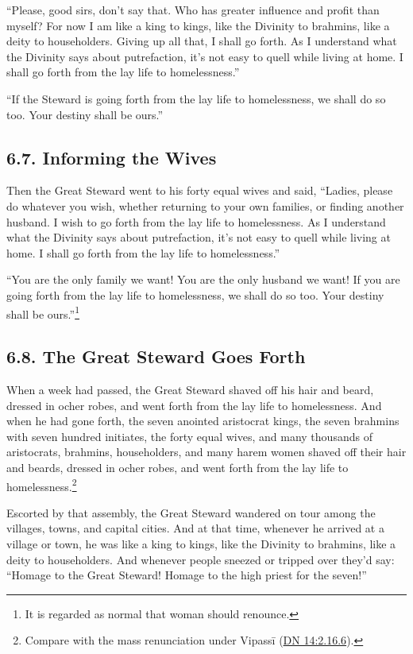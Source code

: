 \documentclass[12pt,openany]{book}%
\begin{document}
“Please, good sirs, don’t say that. Who has greater influence and profit than myself? For now I am like a king to kings, like the Divinity to brahmins, like a deity to householders. Giving up all that, I shall go forth. As I understand what the Divinity says about putrefaction, it’s not easy to quell while living at home. I shall go forth from the lay life to homelessness.” 

“If the Steward is going forth from the lay life to homelessness, we shall do so too. Your destiny shall be ours.” 

\subsection*{6.7. Informing the Wives }

Then the Great Steward went to his forty equal wives and said, “Ladies, please do whatever you wish, whether returning to your own families, or finding another husband. I wish to go forth from the lay life to homelessness. As I understand what the Divinity says about putrefaction, it’s not easy to quell while living at home. I shall go forth from the lay life to homelessness.” 

“You are the only family we want! You are the only husband we want! If you are going forth from the lay life to homelessness, we shall do so too. Your destiny shall be ours.”\footnote{It is regarded as normal that woman should renounce. } 

\subsection*{6.8. The Great Steward Goes Forth }

When a week had passed, the Great Steward shaved off his hair and beard, dressed in ocher robes, and went forth from the lay life to homelessness. And when he had gone forth, the seven anointed aristocrat kings, the seven brahmins with seven hundred initiates, the forty equal wives, and many thousands of aristocrats, brahmins, householders, and many harem women shaved off their hair and beards, dressed in ocher robes, and went forth from the lay life to homelessness.\footnote{Compare with the mass renunciation under \textsanskrit{Vipassī} (\href{https://suttacentral.net/dn14/en/sujato\#2.16.6}{DN 14:2.16.6}). } 

Escorted by that assembly, the Great Steward wandered on tour among the villages, towns, and capital cities. And at that time, whenever he arrived at a village or town, he was like a king to kings, like the Divinity to brahmins, like a deity to householders. And whenever people sneezed or tripped over they’d say: “Homage to the Great Steward! Homage to the high priest for the seven!” 
\end{document}
